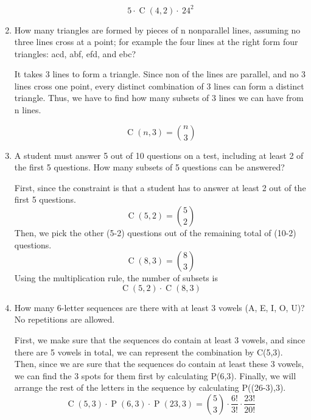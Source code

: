 \documentclass[12pt]{amsart}
\DeclareMathOperator{\perm}{P}
\DeclareMathOperator{\comb}{C}
\begin{document}
\begin{enumerate}
\begin{displaymath}
5\cdot\comb(4,2)\cdot\ 24^{2}
\end{displaymath}

\item
How many triangles are formed by
pieces of n nonparallel lines, assuming
no three lines cross at a point; for example
the four lines at the right form
four triangles: acd, abf, efd, and ebc?

\bigskip
It takes 3 lines to form a  triangle. Since non of the lines are parallel, and no 3 lines cross one point, every distinct combination of 3 lines can form a distinct triangle. Thus, we have to find how many subsets of 3 lines we can have from n lines. 

\begin{displaymath}
\comb(n,3)=\binom{n}{3}
\end{displaymath}

\bigskip

\item
A student must answer 5 out of 10 questions on a test, including at least 2 of
the first 5 questions. How many subsets of 5 questions can be answered?
\bigskip

First, since the constraint is that a student has to answer at least 2 out of the first 5 questions.
 \begin{displaymath}
    \comb(5,2) = \binom{5}{2} 
  \end{displaymath}\bigskip
Then, we pick the other (5-2) questions out of the remaining total of (10-2) questions.
 \begin{displaymath}
    \comb(8,3) = \binom{8}{3} 
      \end{displaymath}
      \bigskip
Using the multiplication rule, the number of subsets is 
      \begin{displaymath}
 \comb(5,2)\cdot \comb(8,3)  
      \end{displaymath}
      \smallskip

\item
How many 6-letter sequences are there with at least 3 vowels (A, E, I, O, U)?
No repetitions are allowed.
\bigskip

First, we make sure that the sequences do contain at least 3 vowels, and since there are 5 vowels in total, we can represent the combination by C(5,3). Then, since we are sure that the sequences do contain at least these 3 vowels, we can find the 3 spots for them first by calculating P(6,3). Finally, we will arrange the rest of the letters in the sequence by calculating P((26-3),3).
\begin{displaymath}
\comb(5,3)\cdot\perm(6,3)\cdot\perm(23,3)=\binom{5}{3}\cdot\frac{6!}{3!}\cdot\frac{23!}{20!}
\end{displaymath}


\end{enumerate}
\end{document}
